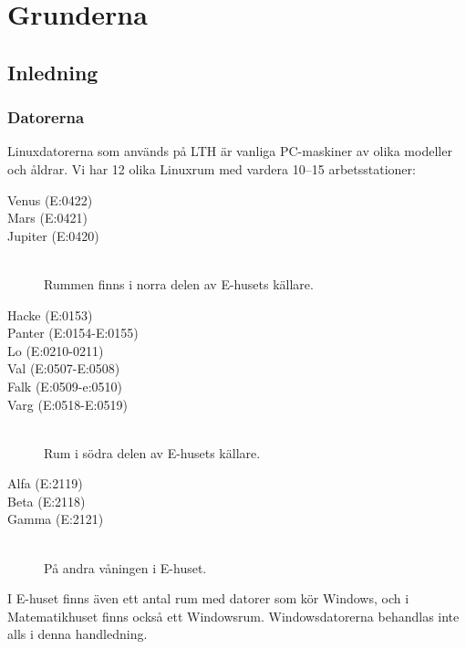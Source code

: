 \documentclass[a4paper,twocolumn]{book}
\begin{document}
\mainmatter

\chapter{Grunderna}
\label{cha:grunderna}



\section{Inledning}


\subsection{Datorerna}

Linuxdatorerna som används på LTH är vanliga PC-maskiner av olika
modeller och åldrar. Vi har 12 olika Linuxrum med
vardera 10--15 arbetsstationer:
\begin{description}
\item[Venus (E:0422)] 
\item[Mars (E:0421)]
\item[Jupiter (E:0420)] \mbox{}\\
  Rummen finns i norra delen av E-husets källare. 
\item[Hacke (E:0153)]
\item[Panter (E:0154-E:0155)] 
\item[Lo (E:0210-0211)]
\item[Val (E:0507-E:0508)]
\item[Falk (E:0509-e:0510)]
\item[Varg (E:0518-E:0519)] \mbox{}\\
  Rum i södra delen av E-husets källare.
\item[Alfa (E:2119)] 
\item[Beta (E:2118)] 
\item[Gamma (E:2121)] \mbox{}\\
  På andra våningen i E-huset.
\end{description}

I E-huset finns även ett antal rum med datorer som kör Windows, och i
Matematikhuset finns också ett Windowsrum.
Windowsdatorerna behandlas inte alls i denna handledning.
\end{document}
